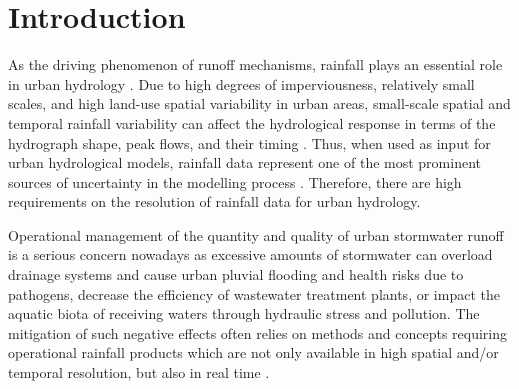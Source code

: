 \documentclass{ctuthesis}\usepackage[]{graphicx}\usepackage[]{color}
\begin{document}
        \maketitle
        


\chapter{Introduction} \label{chap1}

As the driving phenomenon of runoff mechanisms, rainfall plays an essential role in urban hydrology \citep{berneTemporalSpatialResolution2004}. Due to high degrees of imperviousness, relatively small scales, and high land-use spatial variability in urban areas, small-scale spatial and temporal rainfall variability can affect the hydrological response in terms of the hydrograph shape, peak flows, and their timing \citep{cristianoSpatialTemporalVariability2017, ochoa-rodriguezImpactSpatialTemporal2015, rico-ramirezQuantifyingRadarrainfallUncertainties2015}. Thus, when used as input for urban hydrological models, rainfall data represent one of the most prominent sources of uncertainty in the modelling process \citep{schellartInfluenceRainfallEstimation2012, thorndahlEventBasedUncertainty2008}. Therefore, there are high requirements on the resolution of rainfall data for urban hydrology. 

Operational management of the quantity and quality of urban stormwater runoff is a serious concern nowadays \citep{tsihrintzisModelingManagementUrban1997} as excessive amounts of stormwater can overload drainage systems and cause urban pluvial flooding and health risks due to pathogens, decrease the efficiency of wastewater treatment plants, or impact the aquatic biota of receiving waters through hydraulic stress and pollution. The mitigation of such negative effects often relies on methods and concepts requiring operational rainfall products which are not only available in high spatial and/or temporal resolution, but also in real time \citep{einfaltRoadmapUseRadar2004}.
\end{document}
